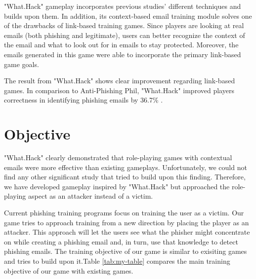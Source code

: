 "What.Hack" gameplay incorporates previous studies' different techniques and builds upon them. In addition, its context-based email training module solves one of the drawbacks of link-based training games. Since players are looking at real emails (both phishing and legitimate), users can better recognize the context of the email and what to look out for in emails to stay protected. Moreover, the emails generated in this game were able to incorporate the primary link-based game goals.

The result from "What.Hack" shows clear improvement regarding link-based games. In comparison to Anti-Phishing Phil, "What.Hack" improved players correctness in identifying phishing emails by 36.7\% \cite{what_hack}.

\section{Objective}

"What.Hack" clearly demonstrated that role-playing games with contextual emails were more effective than existing gameplays. Unfortunately, we could not find any other significant study that tried to build upon this finding. Therefore, we have developed gameplay inspired by "What.Hack" but approached the role-playing aspect as an attacker instead of a victim.

Current phishing training programs focus on training the user as a victim. Our game tries to approach training from a new direction by placing the player as an attacker. This approach will let the users see what the phisher might concentrate on while creating a phishing email and, in turn, use that knowledge to detect phishing emails. The training objective of our game is similar to exisiting games and tries to build upon it.Table \ref{tab:my-table} compares the main training objective of our game with existing games.

